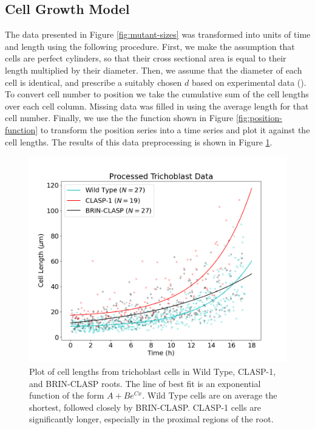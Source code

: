 \subsection{Cell Growth Model}

The data presented in Figure \ref{fig:mutant-sizes} was transformed into units of time and length using the following procedure. First, we make the assumption that cells are perfect cylinders, so that their cross sectional area is equal to their length multiplied by their diameter. Then, we assume that the diameter of each cell is identical, and prescribe a suitably chosen $d$ based on experimental data (\cite{goh2023}). To convert cell number to position we take the cumulative sum of the cell lengths over each cell column. Missing data was filled in using the average length for that cell number. Finally, we use the the function shown in Figure \ref{fig:position-function} to transform the position series into a time series and plot it against the cell lengths. The results of this data preprocessing is shown in Figure \ref{fig:data-trichoblast}.

\begin{figure}[!hbt]
    \centering
    \includegraphics[width=13cm]{img/data-trichoblast.png}
    \caption{Plot of cell lengths from trichoblast cells in Wild Type, CLASP-1, and BRIN-CLASP roots. The line of best fit is an exponential function of the form $A + Be^{Cx}$. Wild Type cells are on average the shortest, followed closely by BRIN-CLASP. CLASP-1 cells are significantly longer, especially in the proximal regions of the root.}
    \label{fig:data-trichoblast}
\end{figure}

